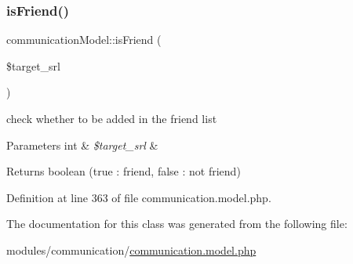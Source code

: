 \subsubsection{\texorpdfstring{is\+Friend()}{isFriend()}}
{\footnotesize\ttfamily communication\+Model\+::is\+Friend (\begin{DoxyParamCaption}\item[{}]{\$target\+\_\+srl }\end{DoxyParamCaption})}

check whether to be added in the friend list 
\begin{DoxyParams}[1]{Parameters}
int & {\em \$target\+\_\+srl} & \\
\hline
\end{DoxyParams}
\begin{DoxyReturn}{Returns}
boolean (true \+: friend, false \+: not friend) 
\end{DoxyReturn}


Definition at line 363 of file communication.\+model.\+php.



The documentation for this class was generated from the following file\+:\begin{DoxyCompactItemize}
\item 
modules/communication/\hyperlink{communication_8model_8php}{communication.\+model.\+php}\end{DoxyCompactItemize}
